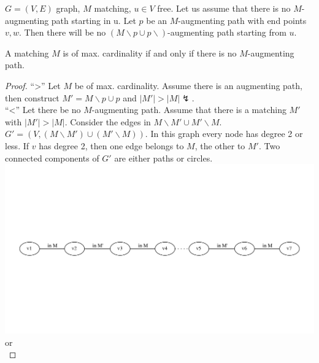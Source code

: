 \begin{lemma}
	$G=(V,E)$ graph, $M$ matching, $u\in V$ free. Let us assume that there is no
	$M$-augmenting path starting in u. Let $p$ be an $M$-augmenting path with end
	points $v, w$. Then there will be no $(M \smallsetminus p \cup p \smallsetminus
	)$-augmenting path starting from $u$.
\end{lemma}
\begin{lemma}
A matching $M$ is of max. cardinality if and only if there is no $M$-augmenting
path.
\end{lemma}

\begin{proof}
``>'' Let $M$ be of max. cardinality. Assume there is an augmenting path, then
construct $M'=M \smallsetminus p \cup p $ and $|M'| > |M| \lightning$. \\
``<'' Let there be no $M$-augmenting path. Assume that there is a matching $M'$
with $|M'| > |M|$. Consider the edges in $M \smallsetminus M' \cup M' \smallsetminus M$.
$G' = (V, (M \smallsetminus M') \cup (M' \smallsetminus M))$. In this graph every node has 
degree 2 or less. If $v$ has degree 2, then one edge belongs to $M$, the other
to $M'$. Two connected components of $G'$ are either paths or circles. \\
		\includegraphics[scale=0.5]{diagrams/Chapter4_Example9.pdf}
\\or\\

\end{proof}
